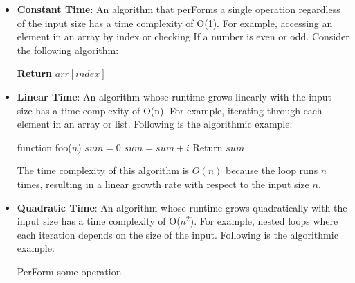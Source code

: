 \documentclass[12pt]{book} %
\begin{document}
\begin{itemize}
    \item \textbf{Constant Time}: An algorithm that perForms a single operation regardless of the input size has a time complexity of O(1). For example, accessing an element in an array by index or checking If a number is even or odd.
    \FloatBarrier
    Consider the following algorithm:
    \FloatBarrier
    \begin{algorithm}
\caption{Access Element in Array}
\begin{algorithmic}[1]
    \State \textbf{Return} $arr[index]$
\EndFunction
\end{algorithmic}
\end{algorithm}
\FloatBarrier
    \item \textbf{Linear Time}: An algorithm whose runtime grows linearly with the input size has a time complexity of O(n). For example, iterating through each element in an array or list.
    \FloatBarrier
    Following is the algorithmic example:
\FloatBarrier
\begin{algorithm}[H]
\caption{Example Algorithm For Big O Notation}
\begin{algorithmic}
\State function foo($n$)
\State $sum = 0$
\State $sum = sum + i$
\EndFor
\State Return $sum$
\end{algorithmic}
\end{algorithm}
\FloatBarrier
The time complexity of this algorithm is $O(n)$ because the loop runs $n$ times, resulting in a linear growth rate with respect to the input size $n$.
    \FloatBarrier
    \item \textbf{Quadratic Time}: An algorithm whose runtime grows quadratically with the input size has a time complexity of O($n^2$). For example, nested loops where each iteration depends on the size of the input.
    \FloatBarrier
    Following is the algorithmic example:
    \FloatBarrier
    \begin{algorithm}
\caption{Nested Loop}
\begin{algorithmic}[1]
            \State PerForm some operation
        \EndFor
    \EndFor
\EndFunction
\end{algorithmic}
\end{algorithm}
\FloatBarrier
\end{itemize}
\end{document}
